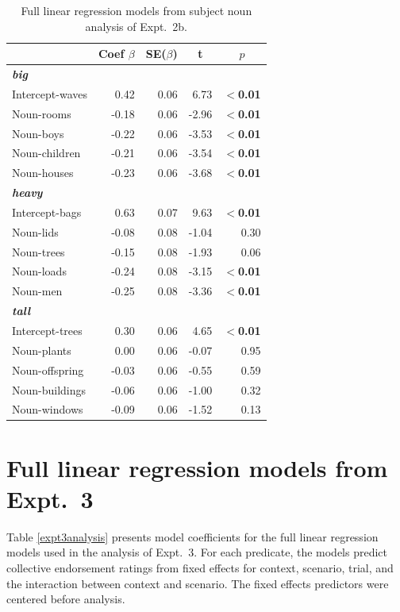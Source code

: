 \documentclass[preprint,12pt,authoryear,titlepage]{elsarticle}
\begin{document}
\begin{table}[htb] 
	\renewcommand\thetable{B.2}
	\centering \caption{Full linear regression models from subject noun analysis of Expt.~2b.} \label{expt2banalysis}
	\begin{tabular}{lrrrr}\toprule
		&	Coef $\beta$	&	SE($\beta$)	&	\multicolumn{1}{c}{ \textbf{t}}	&	\multicolumn{1}{c}{$p$}\\ \midrule
		\emph{\textbf{big}} \\
		Intercept-waves& 	0.42 &	0.06	&	6.73	&	\textbf{$<$0.01} \\
		Noun-rooms	&	-0.18	&   0.06	&	-2.96&	\textbf{$<$0.01} \\
		Noun-boys	&	-0.22&   0.06	&	-3.53	&	\textbf{$<$0.01} \\
		Noun-children	&	-0.21	&   0.06	&	-3.54	&	\textbf{$<$0.01} \\
		Noun-houses	&	-0.23	&   0.06	&	-3.68	&	\textbf{$<$0.01} \\ \hline
		\emph{\textbf{heavy}}\\
		Intercept-bags	& 	0.63	&   0.07	&	9.63	&	\textbf{$<$0.01} \\
		Noun-lids		&	-0.08	&   0.08	&	-1.04	&	0.30\\
		Noun-trees	&	-0.15	&   0.08	&	-1.93	&	0.06 \\
		Noun-loads	&	-0.24	&   0.08	&	-3.15	&	\textbf{$<$0.01} \\
		Noun-men		&	-0.25	&   0.08	&	-3.36	&	\textbf{$<$0.01} \\ \hline
		\emph{\textbf{tall}}\\
		Intercept-trees	& 	0.30	&	0.06	&	4.65	&	\textbf{$<$0.01} \\
		Noun-plants	&	0.00	&   0.06	&	-0.07	&	0.95 \\
		Noun-offspring	&	-0.03	&   0.06	&	-0.55	&	0.59 \\
		Noun-buildings	&	-0.06	&   0.06	&	-1.00	&	0.32 \\
		Noun-windows	&	-0.09	&   0.06	&	-1.52	&	0.13 \\
		\bottomrule
	\end{tabular}
\end{table}

\section{Full linear regression models from Expt.~3}\label{expt3results}

Table \ref{expt3analysis} presents model coefficients for the full linear regression models used in the analysis of Expt.~3. For each predicate, the models predict collective endorsement ratings from fixed effects for context, scenario, trial, and the interaction between context and scenario. The fixed effects predictors were centered before analysis.
\end{document}
